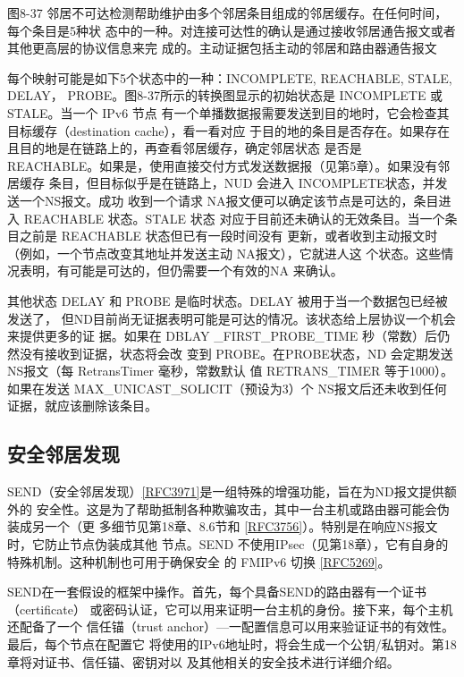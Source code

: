 图8-37 邻居不可达检测帮助维护由多个邻居条目组成的邻居缓存。在任何时间，每个条目是5种状
态中的一种。对连接可达性的确认是通过接收邻居通告报文或者其他更高层的协议信息来完
成的。主动证据包括主动的邻居和路由器通告报文

每个映射可能是如下5个状态中的一种：INCOMPLETE, REACHABLE, STALE, DELAY，
PROBE。图8-37所示的转换图显示的初始状态是 INCOMPLETE 或 STALE。当一个 IPv6 节点
有一个单播数据报需要发送到目的地时，它会检查其目标缓存（destination cache），看一看对应
于目的地的条目是否存在。如果存在且目的地是在链路上的，再查看邻居缓存，确定邻居状态
是否是 REACHABLE。如果是，使用直接交付方式发送数据报（见第5章）。如果没有邻居缓存
条目，但目标似乎是在链路上，NUD 会进入 INCOMPLETE状态，并发送一个NS报文。成功
收到一个请求 NA报文便可以确定该节点是可达的，条目进入 REACHABLE 状态。STALE 状态
对应于目前还未确认的无效条目。当一个条目之前是 REACHABLE 状态但已有一段时间没有
更新，或者收到主动报文时（例如，一个节点改变其地址并发送主动 NA报文），它就进人这
个状态。这些情况表明，有可能是可达的，但仍需要一个有效的NA 来确认。

其他状态 DELAY 和 PROBE 是临时状态。DELAY 被用于当一个数据包已经被发送了，
但ND目前尚无证据表明可能是可达的情况。该状态给上层协议一个机会来提供更多的证
据。如果在 DBLAY \_FIRST\_PROBE\_TIME 秒（常数）后仍然没有接收到证据，状态将会改
变到 PROBE。在PROBE状态，ND 会定期发送NS报文（每 RetransTimer 毫秒，常数默认
值 RETRANS\_TIMER 等于1000）。如果在发送 MAX\_UNICAST\_SOLICIT（预设为3）个
NS报文后还未收到任何证据，就应该删除该条目。

\subsection{安全邻居发现}
SEND（安全邻居发现）\href{https://www.rfc-editor.org/rfc/rfc3971}{[RFC3971]}是一组特殊的增强功能，旨在为ND报文提供额外的
安全性。这是为了帮助抵制各种欺骗攻击，其中一台主机或路由器可能会伪装成另一个（更
多细节见第18章、8.6节和
\href{https://www.rfc-editor.org/rfc/rfc3756}{[RFC3756]}）。特别是在响应NS报文时，它防止节点伪装成其他
节点。SEND 不使用IPsec（见第18章），它有自身的特殊机制。这种机制也可用于确保安全
的 FMIPv6 切换 \href{https://www.rfc-editor.org/rfc/rfc5269}{[RFC5269]}。

SEND在一套假设的框架中操作。首先，每个具备SEND的路由器有一个证书
（certificate） 或密码认证，它可以用来证明一台主机的身份。接下来，每个主机还配备了一个
信任锚（trust anchor）—一配置信息可以用来验证证书的有效性。最后，每个节点在配置它
将使用的IPv6地址时，将会生成一个公钥/私钥对。第18章将对证书、信任锚、密钥对以
及其他相关的安全技术进行详细介绍。

